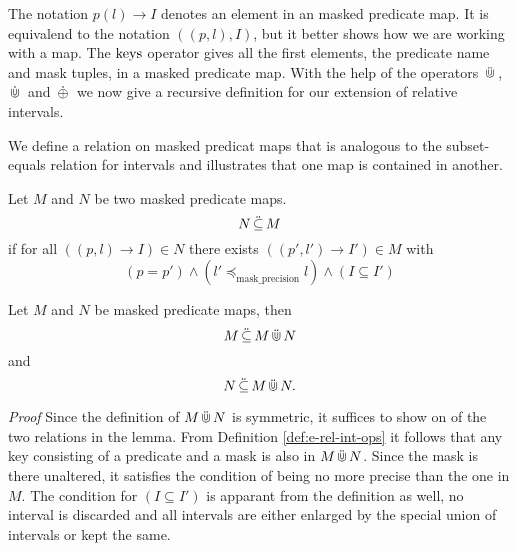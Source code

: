 The notation $p(l) \rightarrow I$ denotes an element in an masked predicate map.
It is equivalend to the notation $((p,l), I)$, but it better shows how we are working with a map.
The $\operatorname{keys}$ operator gives all the first elements, the predicate name and mask tuples, in a masked predicate map.
With the help of the operators $\,\ddot{\Cup}\,$, $\,\dot{\Cup}\,$ and $\,\dot{\oplus}\,$ we now give a recursive definition for our extension of relative intervals.

We define a relation on masked predicat maps that is analogous to the subset-equals relation for intervals and illustrates that one map is contained in another.

\begin{definition}
    \label{def:subseteqmap}
    Let $M$ and $N$ be two masked predicate maps.
    \begin{equation*}
        N \,\ddot{\subseteq}\, M
    \end{equation*}
    if for all $((p,l) \to I) \in N$ there exists $((p',l') \to I') \in M$ with
    \begin{equation*}
        (p = p') \land (l' \preceq_{\text{mask\_precision}} l) \land (I \subseteq I')
    \end{equation*}
\end{definition}

\begin{lemma}
    \label{lem:map-union-subsets}
    Let $M$ and $N$ be masked predicate maps, then
    \begin{equation*}
        M \,\ddot{\subseteq}\, M \,\ddot{\Cup}\, N
    \end{equation*}
    and
    \begin{equation*}
        N \,\ddot{\subseteq}\, M \,\ddot{\Cup}\, N.
    \end{equation*}
\end{lemma}
\textit{Proof}
Since the definition of $M \,\ddot{\Cup}\, N$ is symmetric, it suffices to show on of the two relations in the lemma.
From Definition \ref{def:e-rel-int-ops} it follows that any key consisting of a predicate and a mask is also in $M \,\ddot{\Cup}\, N$.
Since the mask is there unaltered, it satisfies the condition of being no more precise than the one in $M$.
The condition for $(I \subseteq I')$ is apparant from the definition as well, no interval is discarded and all intervals are either enlarged by the special union of intervals or kept the same.


